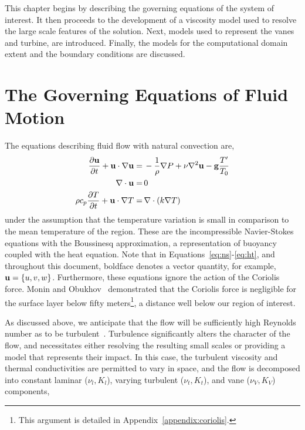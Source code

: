 This chapter begins by describing the governing equations of the system
of interest. It then proceeds to the development of a viscosity model
used to resolve the large scale features of the solution. Next, models
used to represent the vanes and turbine, are introduced.  Finally, the
models for the computational domain extent and the boundary conditions
are discussed. 


\section{The Governing Equations of Fluid Motion}
\label{sub_sec:ns_en}

The equations describing fluid flow with natural convection are,
\begin{align}
  \frac{\partial {\bf u}}{\partial t} + {\bf u} \cdot \nabla {\bf u} =& \,
  -\frac{1}{\rho}\nabla P + \nu \nabla^2 {\bf u} - {\bf g} \frac{T'}{T_0}
 \label{eq:ns} \\
  \nabla \cdot {\bf u} =& \, 0 \label{eq:cont} \\
  \rho c_p \frac{\partial T}{\partial t} + {\bf u} \cdot \nabla T =& \, \nabla
 \cdot ( k \nabla T) \label{eq:ht}
\end{align} 
under the assumption that the temperature variation is small in
comparison to the mean temperature of the region. These are the
incompressible Navier-Stokes equations with the Boussinesq
approximation\cite{boussinesq2010théorie}, a representation of buoyancy
coupled with the heat equation. Note that in
Equations~\ref{eq:ns}-\ref{eq:ht}, and throughout this document,
boldface denotes a vector quantity, for example, ${\bf u} = \{u,v,w\}$.  
Furthermore, these equations ignore the action of the Coriolis force. 
Monin and Obukhov~\cite{monin1954basic} demonstrated that the Coriolis
force is negligible for the surface layer below fifty
meters\footnote{\normalsize This argument is detailed in
Appendix~\ref{appendix:coriolis}.}, a distance well below our region of
interest.    

As discussed above, we anticipate that the flow will be sufficiently
high Reynolds number as to be
turbulent~\cite{Reynolds01011883}. Turbulence significantly alters the
character of the flow,  
and necessitates either resolving the resulting small scales or
providing a model that represents their impact. In this case, 
the turbulent viscosity and thermal conductivities are permitted to vary in
space, and the flow is decomposed into constant laminar
($\nu_{l},K_{l}$), varying turbulent ($\nu_{t},K_{t}$), and vane
($\nu_{V},K_{V}$) components, 

